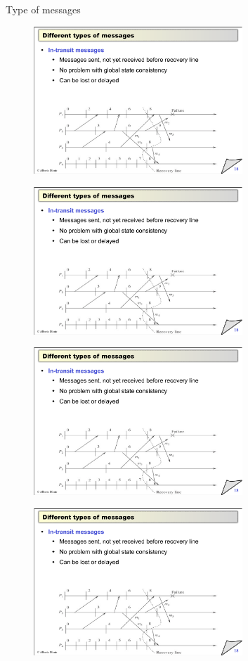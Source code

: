 \begin{frame}{Type of messages}
\begin{overprint}
\begin{figure}
	\includegraphics[width=0.7\textwidth,page=4]{figs/16/messages}
\end{figure}
\begin{figure}
	\includegraphics[width=0.7\textwidth,page=5]{figs/16/messages}
\end{figure}
\begin{figure}
	\includegraphics[width=0.7\textwidth,page=6]{figs/16/messages}
\end{figure}
\begin{figure}
	\includegraphics[width=0.7\textwidth,page=7]{figs/16/messages}

\end{figure}
\end{overprint}
\end{frame}
